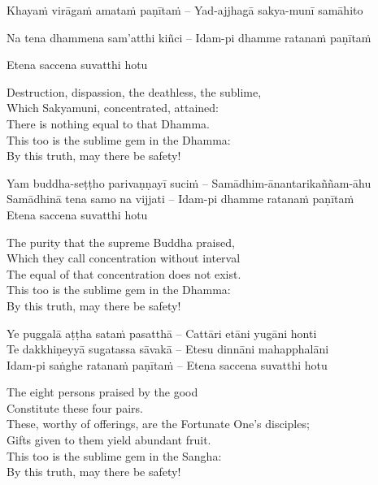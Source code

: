 \begin{pali-hang}
Khayaṁ virāgaṁ amataṁ paṇītaṁ – Yad-ajjhagā sakya-munī samāhito\\
\end{pali-hang}
\begin{pali-hangtogether}
Na tena dhammena sam'atthi kiñci – Idam-pi dhamme ratanaṁ paṇītaṁ\\
\end{pali-hangtogether}
Etena saccena suvatthi hotu

\begin{english-verses}
  Destruction, dispassion, the deathless, the sublime,\\
  Which Sakyamuni, concentrated, attained:\\
  There is nothing equal to that Dhamma.\\
  This too is the sublime gem in the Dhamma:\\
  By this truth, may there be safety!
\end{english-verses}

Yam buddha-seṭṭho parivaṇṇayī suciṁ – Samādhim-ānantarikaññam-āhu\\
Samādhinā tena samo na vijjati – Idam-pi dhamme ratanaṁ paṇītaṁ\\
Etena saccena suvatthi hotu

\begin{english-verses}
  The purity that the supreme Buddha praised,\\
  Which they call concentration without interval\\
  The equal of that concentration does not exist.\\
  This too is the sublime gem in the Dhamma:\\
  By this truth, may there be safety!
\end{english-verses}

Ye puggalā aṭṭha sataṁ pasatthā – Cattāri etāni yugāni honti\\
Te dakkhiṇeyyā sugatassa sāvakā – Etesu dinnāni mahapphalāni\\
Idam-pi saṅghe ratanaṁ paṇītaṁ – Etena saccena suvatthi hotu

\begin{english-verses}
  The eight persons praised by the good\\
  Constitute these four pairs.\\
  These, worthy of offerings, are the Fortunate One's disciples;\\
  Gifts given to them yield abundant fruit.\\
  This too is the sublime gem in the Sangha:\\
  By this truth, may there be safety!
\end{english-verses}

